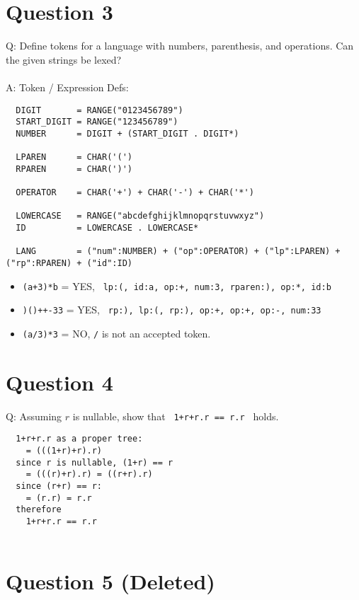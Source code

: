 \documentclass[english]{scrartcl}
\begin{document}
\section*{Question 3}
Q: Define tokens for a language with numbers, parenthesis, and operations. Can the given strings be lexed?
\\
\\
A: Token / Expression Defs:
\begin{verbatim}
  DIGIT       = RANGE("0123456789")
  START_DIGIT = RANGE("123456789")
  NUMBER      = DIGIT + (START_DIGIT . DIGIT*)

  LPAREN      = CHAR('(')
  RPAREN      = CHAR(')')

  OPERATOR    = CHAR('+') + CHAR('-') + CHAR('*')

  LOWERCASE   = RANGE("abcdefghijklmnopqrstuvwxyz")
  ID          = LOWERCASE . LOWERCASE*

  LANG        = ("num":NUMBER) + ("op":OPERATOR) + ("lp":LPAREN) + ("rp":RPAREN) + ("id":ID)
\end{verbatim}

\begin{itemize}
  \item \verb~(a+3)*b~  = YES, \verb~ lp:(, id:a, op:+, num:3, rparen:), op:*, id:b ~
  \item \verb~)()++-33~ = YES, \verb~ rp:), lp:(, rp:), op:+, op:+, op:-, num:33 ~
  \item \verb~(a/3)*3~  = NO, \verb~/~ is not an accepted token.
\end{itemize}


\section*{Question 4}
Q: Assuming $r$ is nullable, show that \verb~ 1+r+r.r == r.r ~ holds.
\\
\begin{verbatim}
  1+r+r.r as a proper tree:
    = (((1+r)+r).r)
  since r is nullable, (1+r) == r
    = (((r)+r).r) = ((r+r).r)
  since (r+r) == r:
    = (r.r) = r.r
  therefore
    1+r+r.r == r.r


\end{verbatim}

\section*{Question 5 (Deleted)}
\end{document}
